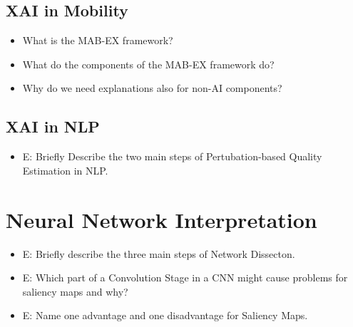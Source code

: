 \documentclass{report}
\newcommand{\asw}[2][teal]{}
\renewcommand{\asw}[2][teal]{\textcolor{#1}{#2}}
\begin{document}
		\subsection{XAI in Mobility}
		
		\begin{itemize}
		\item What is the MAB-EX framework?
		\item What do the components of the MAB-EX framework do?
		\item Why do we need explanations also for non-AI components?
		\end{itemize}
	
		\subsection{XAI in NLP}
		
		\begin{itemize}
		\item E: Briefly Describe the two main steps of Pertubation-based Quality Estimation in NLP.
		\asw{\newline }
		\end{itemize}
	
	\section{Neural Network Interpretation}
	
	\begin{itemize}
		\item E: Briefly describe the three main steps of Network Dissecton.
		\asw{\newline }
		\item E: Which part of a Convolution Stage in a CNN might cause problems for saliency maps and why?
		\asw{\newline }
		\item E: Name one advantage and one disadvantage for Saliency Maps.
		\asw{\newline }
	\end{itemize}
	
	
\end{document}
